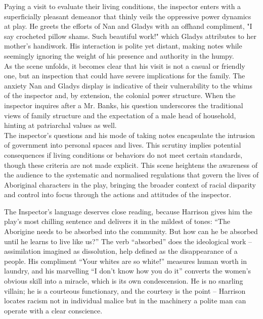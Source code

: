 \documentclass[a4paper]{article}
\begin{document}
Paying a visit to evaluate their living conditions, the inspector enters with a superficially 
pleasant demeanor that thinly veils the oppressive power dynamics at play. He greets the efforts of 
Nan and Gladys with an offhand compliment, "I say crocheted pillow shams. Such beautiful work!" 
which Gladys attributes to her mother's handiwork. His interaction is polite yet distant, making 
notes while seemingly ignoring the weight of his presence and authority in the humpy.\\

As the scene unfolds, it becomes clear that his visit is not a casual or friendly one, but an 
inspection that could have severe implications for the family. The anxiety Nan and Gladys display 
is indicative of their vulnerability to the whims of the inspector and, by extension, the colonial 
power structure. When the inspector inquires after a Mr. Banks, his question underscores the 
traditional views of family structure and the expectation of a male head of household, hinting at 
patriarchal values as well.\\

The inspector's questions and his mode of taking notes encapsulate the intrusion of government into 
personal spaces and lives. This scrutiny implies potential consequences if living conditions or 
behaviors do not meet certain standards, though these criteria are not made explicit. This scene 
heightens the awareness of the audience to the systematic and normalised regulations that govern 
the lives of Aboriginal characters in the play, bringing the broader context of racial disparity 
and control into focus through the actions and attitudes of the inspector.



The Inspector's language deserves close reading, because Harrison gives him the play's most chilling sentence and delivers it in the mildest of tones: ``The Aborigine needs to be absorbed into the community. But how can he be absorbed until he learns to live like us?'' The verb ``absorbed'' does the ideological work -- assimilation imagined as dissolution, help defined as the disappearance of a people. His compliment ``Your whites are so white!'' measures human worth in laundry, and his marvelling ``I don't know how you do it'' converts the women's obvious skill into a miracle, which is its own condescension. He is no snarling villain; he is a courteous functionary, and the courtesy is the point -- Harrison locates racism not in individual malice but in the machinery a polite man can operate with a clear conscience.\\
\end{document}
